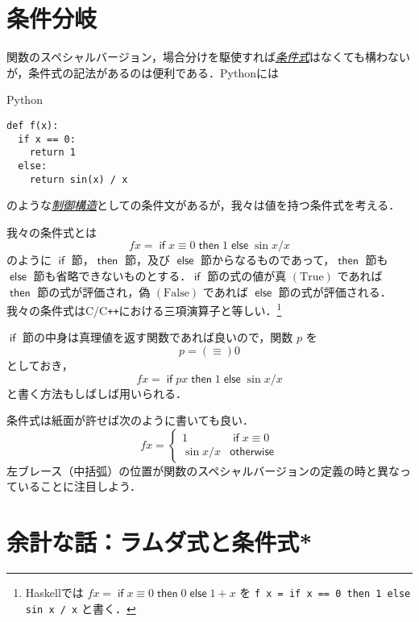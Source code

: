 \documentclass[a4paper,draft]{jsbook}
\newcommand{\programminglanguage}[1]{\textsf{#1}}
\newcommand{\clang}{\programminglanguage{C}}
\newcommand{\cxx}{\programminglanguage{C}\texttt{++}}
\newcommand{\haskell}{\programminglanguage{Haskell}}
\newcommand{\python}{\programminglanguage{Python}}
\newcommand{\keyword}[1]{{\underline{\emph{#1}}}}
\newcommand{\code}[1]{\texttt{#1}}
\newenvironment{pythoncode}{\begin{itembox}[r]{\python}}{\end{itembox}}
\newcommand{\mSpecialConst}[1]{\mathrm{#1}} %
\newcommand{\mTrue}{\mSpecialConst{True}}
\newcommand{\mFalse}{\mSpecialConst{False}}
\newcommand{\mKeyword}[1]{\mathsf{#1}}
\newcommand{\mIfKeyword}{\mKeyword{if}}
\newcommand{\mOtherwiseKeyword}{\mKeyword{otherwise}}
\newcommand{\mThenKeyword}{\mKeyword{then}}
\newcommand{\mElseKeyword}{\mKeyword{else}}
\DeclareMathOperator{\mIf}{\mIfKeyword}
\DeclareMathOperator{\mOtherwise}{\mOtherwiseKeyword}
\DeclareMathOperator{\mThen}{\mThenKeyword}
\DeclareMathOperator{\mElse}{\mElseKeyword}
\newcommand{\mIfThenElse}[3]{\mIf{#1}\mThen{#2}\mElse{#3}}
\begin{document}
\section{条件分岐}
\label{sec:if}

関数のスペシャルバージョン，場合分けを駆使すれば\keyword{条件式}はなくても構わないが，条件式の記法があるのは便利である．\python には
\begin{pythoncode}
\begin{verbatim}
def f(x):
  if x == 0:
    return 1
  else:
    return sin(x) / x
\end{verbatim}
\end{pythoncode}
のような\keyword{制御構造}としての条件文があるが，我々は値を持つ条件式を考える．

我々の条件式とは
\begin{equation}
fx
=\mIfThenElse{x\equiv0}{1}{\sin x/x}
\end{equation}
のように $\mIf$ 節，$\mThen$ 節，及び $\mElse$ 節からなるものであって，$\mThen$ 節も $\mElse$ 節も省略できないものとする．$\mIf$ 節の式の値が真 $(\mTrue)$ であれば $\mThen$ 節の式が評価され，偽 $(\mFalse)$ であれば $\mElse$ 節の式が評価される．我々の条件式は\clang/\cxx における三項演算子と等しい．\footnote{\haskell では $fx=\mIfThenElse{x\equiv0}{0}{1+x}$ を \code{f x = if x == 0 then 1 else sin x / x} と書く．}

$\mIf$ 節の中身は真理値を返す関数であれば良いので，関数 $p$ を
\begin{equation}
p=(\equiv)0
\end{equation}
としておき，
\begin{equation}
fx=\mIfThenElse{px}{1}{\sin x/x}
\end{equation}
と書く方法もしばしば用いられる．

条件式は紙面が許せば次のように書いても良い．
\begin{equation}
fx=\begin{cases}
1&\mIf x\equiv0\\
\sin x/x&\mOtherwise
\end{cases}
\end{equation}
左ブレース（中括弧）の位置が関数のスペシャルバージョンの定義の時と異なっていることに注目しよう．

\section{余計な話：ラムダ式と条件式*}
\end{document}
